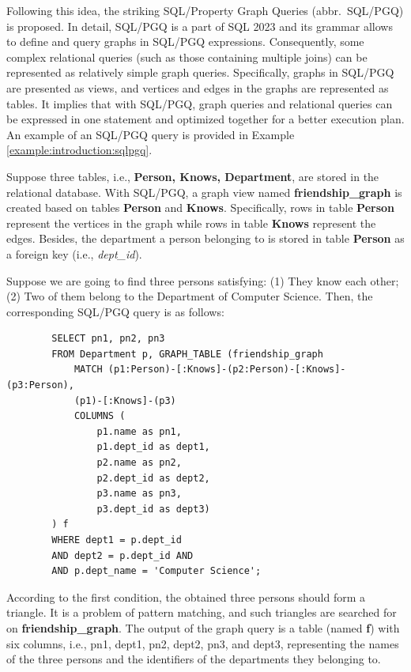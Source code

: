 {Following this idea, the striking SQL/Property Graph Queries (abbr.~SQL/PGQ) is proposed.
In detail, SQL/PGQ is a part of SQL 2023 and its grammar allows to define and query graphs in SQL/PGQ expressions.
Consequently, some complex relational queries (such as those containing multiple joins) can be represented as relatively simple graph queries.
Specifically, graphs in SQL/PGQ are presented as views, and vertices and edges in the graphs are represented as tables.
It implies that with SQL/PGQ, graph queries and relational queries can be expressed in one statement and optimized together for a better execution plan.
An example of an SQL/PGQ query is provided in Example \ref{example:introduction:sqlpgq}.

\begin{example}
    \label{example:introduction:sqlpgq}
    Suppose three tables, i.e., \textbf{Person, Knows, Department}, are stored in the relational database.
    With SQL/PGQ, a graph view named \textbf{friendship\_graph} is created based on tables \textbf{Person} and \textbf{Knows}.
    Specifically, rows in table \textbf{Person} represent the vertices in the graph while rows in table \textbf{Knows} represent the edges.
    Besides, the department a person belonging to is stored in table \textbf{Person} as a foreign key (i.e., \textit{dept\_id}).

    Suppose we are going to find three persons satisfying: (1) They know each other; (2) Two of them belong to the Department of Computer Science.
    Then, the corresponding SQL/PGQ query is as follows:
    \begin{lstlisting}
        SELECT pn1, pn2, pn3
        FROM Department p, GRAPH_TABLE (friendship_graph
            MATCH (p1:Person)-[:Knows]-(p2:Person)-[:Knows]-(p3:Person),
            (p1)-[:Knows]-(p3)
            COLUMNS (
                p1.name as pn1,
                p1.dept_id as dept1,
                p2.name as pn2,
                p2.dept_id as dept2,
                p3.name as pn3,
                p3.dept_id as dept3)
        ) f
        WHERE dept1 = p.dept_id
        AND dept2 = p.dept_id AND
        AND p.dept_name = 'Computer Science';
    \end{lstlisting}
    According to the first condition, the obtained three persons should form a triangle.
    It is a problem of pattern matching, and such triangles are searched for on \textbf{friendship\_graph}.
    The output of the graph query is a table (named \textbf{f}) with six columns, i.e., pn1, dept1, pn2, dept2, pn3, and dept3, representing the names of the three persons and the identifiers of the departments they belonging to.


\end{example}}
